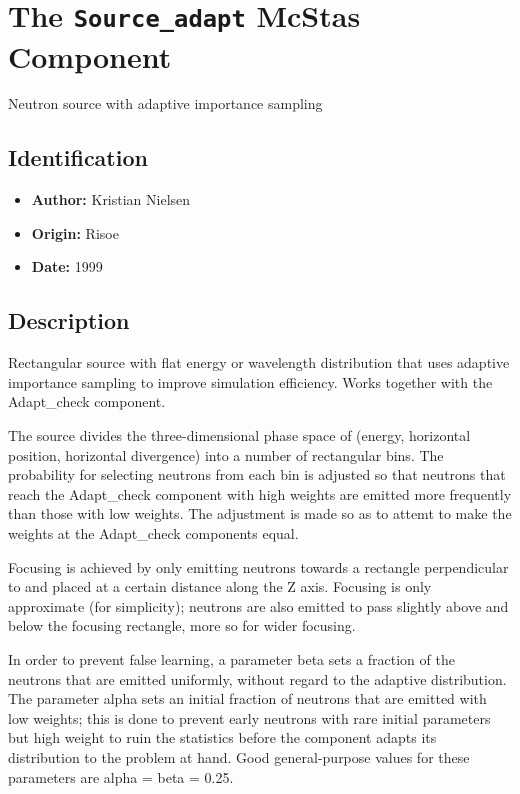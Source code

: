 \section{The \texttt{Source\_adapt} McStas Component}
Neutron source with adaptive importance sampling

\subsection*{Identification}
\begin{itemize}
  \item \textbf{Author:} Kristian Nielsen
  \item \textbf{Origin:} Risoe
  \item \textbf{Date:} 1999
\end{itemize}

\subsection*{Description}
Rectangular source with flat energy or wavelength distribution that uses adaptive importance sampling to improve simulation efficiency. Works together with the Adapt\_check component.

The source divides the three-dimensional phase space of (energy, horizontal position, horizontal divergence) into a number of rectangular bins. The probability for selecting neutrons from each bin is adjusted so that neutrons that reach the Adapt\_check component with high weights are emitted more frequently than those with low weights. The adjustment is made so as to attemt to make the weights at the Adapt\_check components equal.

Focusing is achieved by only emitting neutrons towards a rectangle perpendicular to and placed at a certain distance along the Z axis. Focusing is only approximate (for simplicity); neutrons are also emitted to pass slightly above and below the focusing rectangle, more so for wider focusing.

In order to prevent false learning, a parameter beta sets a fraction of the neutrons that are emitted uniformly, without regard to the adaptive distribution. The parameter alpha sets an initial fraction of neutrons that are emitted with low weights; this is done to prevent early neutrons with rare initial parameters but high weight to ruin the statistics before the component adapts its distribution to the problem at hand. Good general-purpose values for these parameters are alpha = beta = 0.25.

